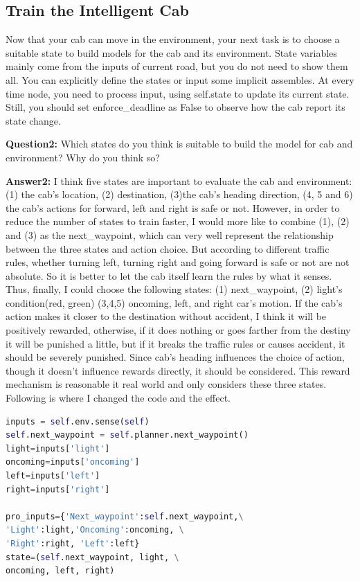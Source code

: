 \documentclass[11pt,a4paper]{article}
\begin{document}
\begin{flushleft}
\section{Train the Intelligent Cab}
\end{flushleft}
Now that your cab can move in the environment, your next task is to choose a suitable state to build models for the cab and its environment. State variables mainly come from the inputs of current road, but you do not need to show them all. You can explicitly define the states or input some implicit assembles. At every time node, you need to process input, using self.state to update its current state. Still, you should set enforce\_deadline as False to observe how the cab report its state change.

\vspace{3mm}
\noindent
\textbf{Question2:} Which states do you think is suitable to build the model for cab and environment? Why do you think so?

\vspace{3mm}
\noindent
\textbf{Answer2:} I think five states are important to evaluate the cab and environment: (1) the cab’s location, (2) destination, (3)the cab’s heading direction, (4, 5 and 6) the cab’s actions for forward, left and right is safe or not. However, in order to reduce the number of states to train faster, I would more like to combine (1), (2) and (3) as the next\_waypoint, which can very well represent the relationship between the three states and action choice. But according to different traffic rules, whether turning left, turning right and going forward is safe or not are not absolute. So it is better to let the cab itself learn the rules by what it senses. Thus, finally, I could choose the following states: (1) next\_waypoint, (2) light’s condition(red, green) (3,4,5) oncoming, left, and right car’s motion. If the cab’s action makes it closer to the destination without accident, I think it will be positively rewarded, otherwise, if it does nothing or goes farther from the destiny it will be punished a little, but if it breaks the traffic rules or causes accident, it should be severely punished. Since cab’s heading influences the choice of action, though it doesn’t influence rewards directly, it should be considered. This reward mechanism is reasonable it real world and only considers these three states. Following is where I changed the code and the effect.

\begin{lstlisting}[language={Python}]
inputs = self.env.sense(self)
self.next_waypoint = self.planner.next_waypoint()
light=inputs['light']
oncoming=inputs['oncoming']
left=inputs['left']
right=inputs['right']
 
pro_inputs={'Next_waypoint':self.next_waypoint,\
'Light':light,'Oncoming':oncoming, \
'Right':right, 'Left':left}
state=(self.next_waypoint, light, \
oncoming, left, right)
\end{lstlisting}
\end{document}

